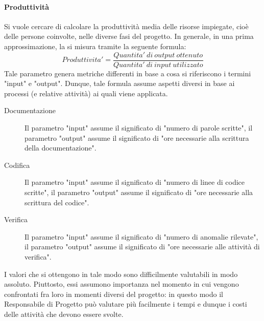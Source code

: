 				\paragraph{Produttività}
					Si vuole cercare di calcolare la produttività media delle risorse impiegate, cioè delle persone coinvolte, nelle diverse fasi del 
					progetto. In generale, in una prima approssimazione, la si misura tramite la seguente formula:
					\begin{equation}
						Produttivita' = \frac{Quantita'\ di\ output\ ottenuto}{Quantita'\ di\ input\ utilizzato}
						\label{Produttività}
					\end{equation}
					Tale parametro genera metriche differenti in base a cosa si riferiscono i termini "input" e "output". Dunque, tale formula assume 
					aspetti diversi in base ai processi (e relative attività) ai quali viene applicata.
					\begin{description}
						\item[Documentazione] Il parametro "input" assume il significato di "numero di parole scritte", il parametro "output" assume il 
						significato di "ore necessarie alla scrittura della documentazione".
						\item[Codifica] Il parametro "input" assume il significato di "numero di linee di codice scritte", il parametro "output" assume 
						il significato di "ore necessarie alla scrittura del codice".
						\item[Verifica] Il parametro "input" assume il significato di "numero di anomalie rilevate", il parametro "output" assume il 
						significato di "ore necessarie alle attività di verifica".
					\end{description}
					I valori che si ottengono in tale modo sono difficilmente valutabili in modo assoluto. Piuttosto, essi assumono importanza nel 
					momento in cui vengono confrontati fra loro in momenti diversi del progetto: in questo modo il Responsabile di Progetto può valutare 
					più facilmente i tempi e dunque i costi delle attività che devono essere svolte.
